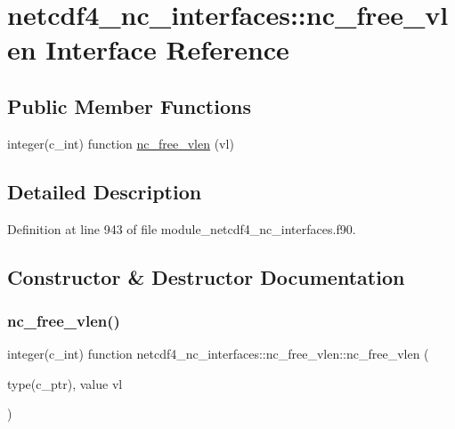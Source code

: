 \hypertarget{interfacenetcdf4__nc__interfaces_1_1nc__free__vlen}{}\section{netcdf4\+\_\+nc\+\_\+interfaces\+:\+:nc\+\_\+free\+\_\+vlen Interface Reference}
\label{interfacenetcdf4__nc__interfaces_1_1nc__free__vlen}
\subsection*{Public Member Functions}
\begin{DoxyCompactItemize}
\item 
integer(c\+\_\+int) function \hyperlink{interfacenetcdf4__nc__interfaces_1_1nc__free__vlen_a548b8db406c8234baf828ccbcf657c25}{nc\+\_\+free\+\_\+vlen} (vl)
\end{DoxyCompactItemize}


\subsection{Detailed Description}


Definition at line 943 of file module\+\_\+netcdf4\+\_\+nc\+\_\+interfaces.\+f90.



\subsection{Constructor \& Destructor Documentation}
\mbox{\label{interfacenetcdf4__nc__interfaces_1_1nc__free__vlen_a548b8db406c8234baf828ccbcf657c25}} 
\subsubsection{\texorpdfstring{nc\+\_\+free\+\_\+vlen()}{nc\_free\_vlen()}}
{\footnotesize\ttfamily integer(c\+\_\+int) function netcdf4\+\_\+nc\+\_\+interfaces\+::nc\+\_\+free\+\_\+vlen\+::nc\+\_\+free\+\_\+vlen (\begin{DoxyParamCaption}\item[{type(c\+\_\+ptr), value}]{vl }\end{DoxyParamCaption})}



